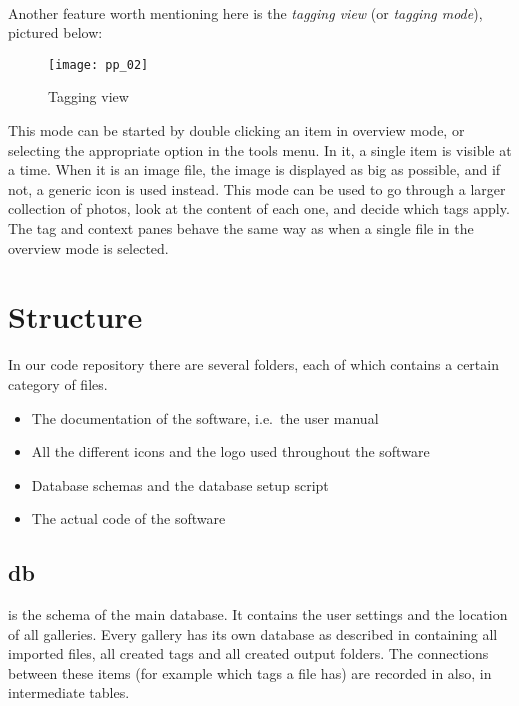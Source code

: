 \paragraph{}
Another feature worth mentioning here is the \textit{tagging view} (or
\textit{tagging mode}), pictured below:

\begin{figure}
	\centering
	\texttt{[image: pp\_02]}
	\caption{Tagging view}
\end{figure}

This mode can be started by double clicking an item in overview mode, or
selecting the appropriate option in the tools menu. In it, a single item is
visible at a time. When it is an image file, the image is displayed as big as
possible, and if not, a generic icon is used instead. This mode can be used to
go through a larger collection of photos, look at the content of each one, and
decide which tags apply. The tag and context panes behave the same way as when
a single file in the overview mode is selected.




\section{Structure}
\def\kapitelautor{Clemens Stadlbauer}

In our code repository there are several folders, each of which contains a
certain category of files.

\begin{itemize}
	\item[\tfpath{doc/}] The documentation of the software, i.e.~the user manual
	\item[\tfpath{icons/}] All the different icons and the logo used throughout the software
	\item[\tfpath{db/}] Database schemas and the database setup script
	\item[\tfpath{src/}] The actual code of the software
\end{itemize}

\subsection{db}
 is the schema of the main database. It contains the user
settings and the location of all galleries. Every gallery has its own
database as described in  containing all imported files,
all created tags and all created output folders. The connections between these
items (for example which tags a file has) are recorded in also,
in intermediate tables.

